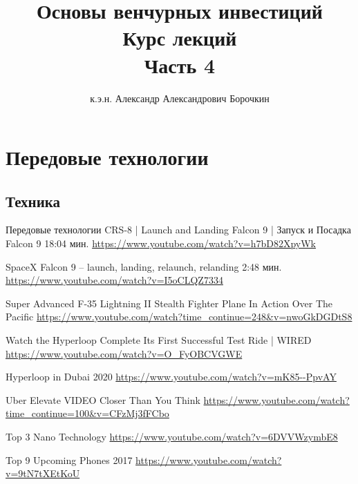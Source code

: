 \documentclass[12pt]{beamer}
\title[Основы венчурных инвестиций]{Основы венчурных инвестиций\\Курс лекций\\Часть 4}
\author{к.э.н. Александр Александрович Борочкин}
\institute{Нижегородский государственный университет}
\date{\the\year}
\begin{document}
	
	
\begin{frame}
\titlepage
\end{frame}

\section{Передовые технологии}
\subsection{Техника}
\begin{frame}[ allowframebreaks ]{Передовые технологии}
CRS-8 | Launch and Landing Falcon 9 | Запуск и Посадка Falcon 9  18:04 мин.
\url{https://www.youtube.com/watch?v=h7bD82XpyWk}

SpaceX Falcon 9 – launch, landing, relaunch, relanding 2:48 мин.
\url{https://www.youtube.com/watch?v=I5oCLQZ7334}

Super Advanced F-35 Lightning II Stealth Fighter Plane In Action Over The Pacific
\url{https://www.youtube.com/watch?time_continue=248&v=nwoGkDGDtS8}

\pagebreak
Watch the Hyperloop Complete Its First Successful Test Ride | WIRED
\url{https://www.youtube.com/watch?v=O_FyOBCVGWE}

Hyperloop in Dubai 2020
\url{https://www.youtube.com/watch?v=mK85--PpvAY}

Uber Elevate VIDEO Closer Than You Think
\url{https://www.youtube.com/watch?time_continue=100&v=CFzMj3fFCbo}

\pagebreak
Top 3 Nano Technology
\url{https://www.youtube.com/watch?v=6DVVWzymbE8}

Top 9 Upcoming Phones 2017
\url{https://www.youtube.com/watch?v=9tN7tXEtKoU}

\end{frame}



\end{document}
